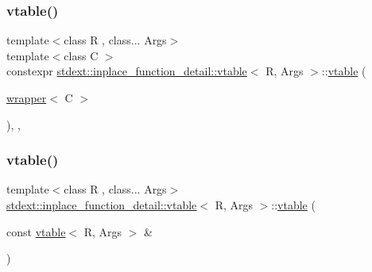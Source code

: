 \mbox{\label{structstdext_1_1inplace__function__detail_1_1vtable_ae59e9dfc5b677cbb7f9397cfc52f2b47}} 
\subsubsection{\texorpdfstring{vtable()}{vtable()}\hspace{0.1cm}{\footnotesize\ttfamily [6/8]}}
{\footnotesize\ttfamily template$<$class R , class... Args$>$ \\
template$<$class C $>$ \\
constexpr \hyperlink{structstdext_1_1inplace__function__detail_1_1vtable}{stdext\+::inplace\+\_\+function\+\_\+detail\+::vtable}$<$ R, Args $>$\+::\hyperlink{structstdext_1_1inplace__function__detail_1_1vtable}{vtable} (\begin{DoxyParamCaption}\item[{\hyperlink{structstdext_1_1inplace__function__detail_1_1wrapper}{wrapper}$<$ C $>$}]{ }\end{DoxyParamCaption})\hspace{0.3cm}{\ttfamily [inline]}, {\ttfamily [explicit]}, {\ttfamily [noexcept]}}

\mbox{\label{structstdext_1_1inplace__function__detail_1_1vtable_abf869e5503c88d7baf3c9098f566f63e}} 
\subsubsection{\texorpdfstring{vtable()}{vtable()}\hspace{0.1cm}{\footnotesize\ttfamily [7/8]}}
{\footnotesize\ttfamily template$<$class R , class... Args$>$ \\
\hyperlink{structstdext_1_1inplace__function__detail_1_1vtable}{stdext\+::inplace\+\_\+function\+\_\+detail\+::vtable}$<$ R, Args $>$\+::\hyperlink{structstdext_1_1inplace__function__detail_1_1vtable}{vtable} (\begin{DoxyParamCaption}\item[{const \hyperlink{structstdext_1_1inplace__function__detail_1_1vtable}{vtable}$<$ R, Args $>$ \&}]{ }\end{DoxyParamCaption})\hspace{0.3cm}{\ttfamily [delete]}}

